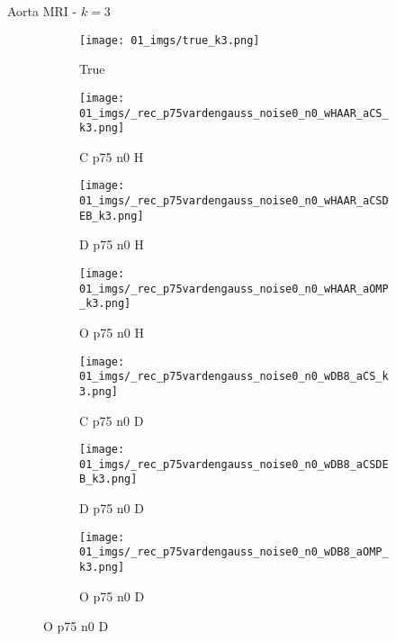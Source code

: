 \begin{frame}{Aorta MRI - $k=3$}{}
\begin{figure}
\begin{subfigure}{0.13\textwidth}
\texttt{[image: 01\_imgs/true\_k3.png]}
\caption*{\tiny True}
\end{subfigure}
\begin{subfigure}{0.13\textwidth}
\texttt{[image: 01\_imgs/\_rec\_p75vardengauss\_noise0\_n0\_wHAAR\_aCS\_k3.png]}
\caption*{\tiny C p75 n0 H}
\end{subfigure}
\begin{subfigure}{0.13\textwidth}
\texttt{[image: 01\_imgs/\_rec\_p75vardengauss\_noise0\_n0\_wHAAR\_aCSDEB\_k3.png]}
\caption*{\tiny D p75 n0 H}
\end{subfigure}
\begin{subfigure}{0.13\textwidth}
\texttt{[image: 01\_imgs/\_rec\_p75vardengauss\_noise0\_n0\_wHAAR\_aOMP\_k3.png]}
\caption*{\tiny O p75 n0 H}
\end{subfigure}
\begin{subfigure}{0.13\textwidth}
\texttt{[image: 01\_imgs/\_rec\_p75vardengauss\_noise0\_n0\_wDB8\_aCS\_k3.png]}
\caption*{\tiny C p75 n0 D}
\end{subfigure}
\begin{subfigure}{0.13\textwidth}
\texttt{[image: 01\_imgs/\_rec\_p75vardengauss\_noise0\_n0\_wDB8\_aCSDEB\_k3.png]}
\caption*{\tiny D p75 n0 D}
\end{subfigure}
\begin{subfigure}{0.13\textwidth}
\texttt{[image: 01\_imgs/\_rec\_p75vardengauss\_noise0\_n0\_wDB8\_aOMP\_k3.png]}
\caption*{\tiny O p75 n0 D}
\end{subfigure}
\end{figure}
\end{frame}


